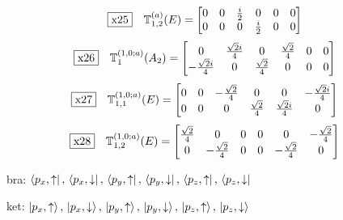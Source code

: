 \documentclass[fleqn,10pt,landscape]{jsarticle}
\begin{document}
\begin{dmath*}
\fbox{x25}\quad \mathbb{T}_{1,2}^{(a)}(E)=\begin{bmatrix} 0 & 0 & \frac{i}{2} & 0 & 0 & 0 \\ 0 & 0 & 0 & \frac{i}{2} & 0 & 0 \end{bmatrix}
\end{dmath*}
\begin{dmath*}
\fbox{x26}\quad \mathbb{T}_{1}^{(1,0;a)}(A_{2})=\begin{bmatrix} 0 & \frac{\sqrt{2} i}{4} & 0 & \frac{\sqrt{2}}{4} & 0 & 0 \\ - \frac{\sqrt{2} i}{4} & 0 & \frac{\sqrt{2}}{4} & 0 & 0 & 0 \end{bmatrix}
\end{dmath*}
\begin{dmath*}
\fbox{x27}\quad \mathbb{T}_{1,1}^{(1,0;a)}(E)=\begin{bmatrix} 0 & 0 & - \frac{\sqrt{2}}{4} & 0 & 0 & - \frac{\sqrt{2} i}{4} \\ 0 & 0 & 0 & \frac{\sqrt{2}}{4} & \frac{\sqrt{2} i}{4} & 0 \end{bmatrix}
\end{dmath*}
\begin{dmath*}
\fbox{x28}\quad \mathbb{T}_{1,2}^{(1,0;a)}(E)=\begin{bmatrix} \frac{\sqrt{2}}{4} & 0 & 0 & 0 & 0 & - \frac{\sqrt{2}}{4} \\ 0 & - \frac{\sqrt{2}}{4} & 0 & 0 & - \frac{\sqrt{2}}{4} & 0 \end{bmatrix}
\end{dmath*}
\vspace{5mm}

\noindent\textbullet\, bra: $\bra{p_{x},\uparrow},\, \bra{p_{x},\downarrow},\, \bra{p_{y},\uparrow},\, \bra{p_{y},\downarrow},\, \bra{p_{z},\uparrow},\, \bra{p_{z},\downarrow}$

\noindent\textbullet\, ket: $\ket{p_{x},\uparrow},\, \ket{p_{x},\downarrow},\, \ket{p_{y},\uparrow},\, \ket{p_{y},\downarrow},\, \ket{p_{z},\uparrow},\, \ket{p_{z},\downarrow}$
\end{document}
